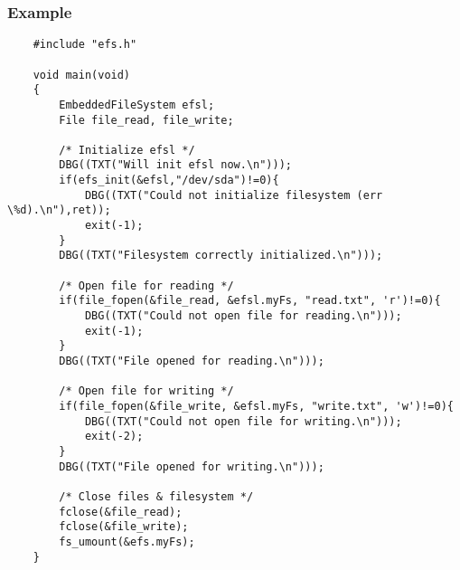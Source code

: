 \subsubsection*{Example}
\lstset{numbers=left, stepnumber=1, numberstyle=\small, numbersep=5pt, tabsize=4}
\begin{lstlisting}
	#include "efs.h"

	void main(void)
	{
		EmbeddedFileSystem efsl;
		File file_read, file_write;

		/* Initialize efsl */
		DBG((TXT("Will init efsl now.\n")));
		if(efs_init(&efsl,"/dev/sda")!=0){
			DBG((TXT("Could not initialize filesystem (err \%d).\n"),ret));
			exit(-1);
		}
		DBG((TXT("Filesystem correctly initialized.\n")));

		/* Open file for reading */
		if(file_fopen(&file_read, &efsl.myFs, "read.txt", 'r')!=0){
			DBG((TXT("Could not open file for reading.\n")));
			exit(-1);
		}
		DBG((TXT("File opened for reading.\n")));

		/* Open file for writing */
		if(file_fopen(&file_write, &efsl.myFs, "write.txt", 'w')!=0){
			DBG((TXT("Could not open file for writing.\n")));
			exit(-2);
		}
		DBG((TXT("File opened for writing.\n")));

		/* Close files & filesystem */
		fclose(&file_read);
		fclose(&file_write);
		fs_umount(&efs.myFs);
	}
\end{lstlisting}
